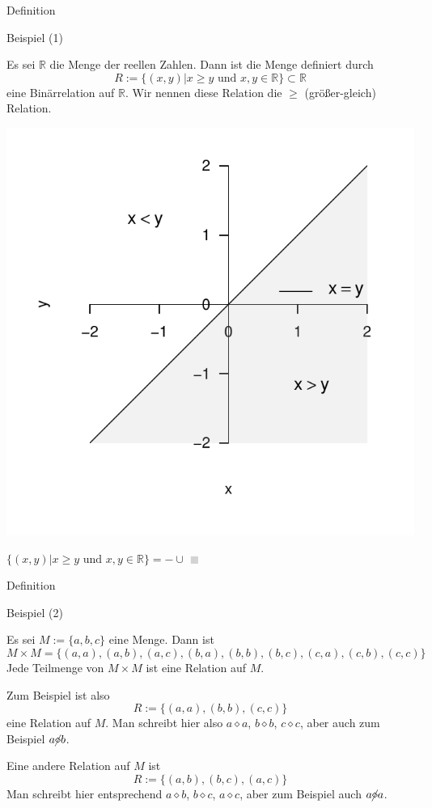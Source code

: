 \documentclass[
  8pt,
  ignorenonframetext,
]{beamer}
\begin{document}
\begin{frame}{Definition}
\protect\hypertarget{definition-4}{}
\small

Beispiel (1)

\footnotesize

Es sei \(\mathbb{R}\) die Menge der reellen Zahlen. Dann ist die Menge
definiert durch \begin{equation}
R := \{(x,y)|x \ge y \mbox{ und } x,y \in \mathbb{R}\} \subset \mathbb{R}
\end{equation} eine Binärrelation auf \(\mathbb{R}\). Wir nennen diese
Relation die \(\ge\) (größer-gleich) Relation. \vfill \large \center

\begin{center}\includegraphics[width=0.5\linewidth]{5_Abbildungen/pfm_5_ge} \end{center}
\vspace{-5mm}
\center
\footnotesize

\(\{(x,y)|x \ge y \mbox{ und } x,y \in \mathbb{R}\} = - \cup\)
\textcolor{lightgray}{$\blacksquare$}
\end{frame}

\begin{frame}{Definition}
\protect\hypertarget{definition-5}{}
\small

Beispiel (2)

\footnotesize

Es sei \(M := \{a,b,c\}\) eine Menge. Dann ist \begin{equation}
M \times M = \{(a,a), (a,b), (a,c), (b,a), (b,b), (b,c), (c,a), (c,b), (c,c)\}
\end{equation} Jede Teilmenge von \(M \times M\) ist eine Relation auf
\(M\).

Zum Beispiel ist also \begin{equation}
R := \{(a,a), (b,b), (c,c)\}
\end{equation} eine Relation auf \(M\). Man schreibt hier also
\(a \diamond a\), \(b \diamond b\), \(c \diamond c\), aber auch zum
Beispiel \(a \cancel{\diamond}b\).

Eine andere Relation auf \(M\) ist \begin{equation}
R := \{(a,b), (b,c), (a,c)\}
\end{equation} Man schreibt hier entsprechend \(a \diamond b\),
\(b \diamond c\), \(a \diamond c\), aber zum Beispiel auch
\(a \cancel{\diamond}a\).
\end{frame}
\end{document}
